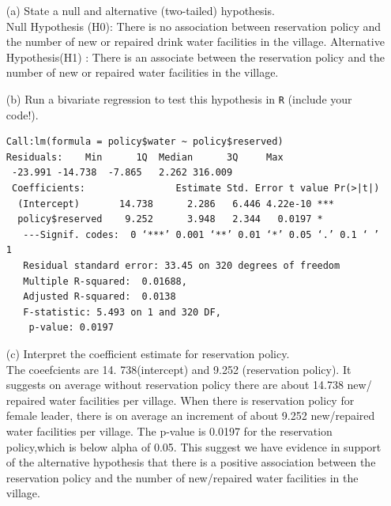 \documentclass[12pt,letterpaper]{article}
\begin{document}
\newpage
\begin{enumerate}
	\item [(a)] State a null and alternative (two-tailed) hypothesis. 
\\Null Hypothesis (H0): There is no association between reservation policy and the number of new or repaired drink water facilities in the village.
Alternative Hypothesis(H1)	: There is an associate between the reservation policy and the number of new or repaired water facilities in the village.
	\vspace{6cm}
	\item [(b)] Run a bivariate regression to test this hypothesis in \texttt{R} (include your code!).
	  	
\begin{verbatim}
Call:lm(formula = policy$water ~ policy$reserved)
Residuals:    Min      1Q  Median      3Q     Max
 -23.991 -14.738  -7.865   2.262 316.009 
 Coefficients:                Estimate Std. Error t value Pr(>|t|)   
  (Intercept)       14.738      2.286   6.446 4.22e-10 ***
  policy$reserved    9.252      3.948   2.344   0.0197 * 
   ---Signif. codes:  0 ‘***’ 0.001 ‘**’ 0.01 ‘*’ 0.05 ‘.’ 0.1 ‘ ’ 1
   Residual standard error: 33.45 on 320 degrees of freedom
   Multiple R-squared:  0.01688,	
   Adjusted R-squared:  0.0138 
   F-statistic: 5.493 on 1 and 320 DF, 
    p-value: 0.0197
\end{verbatim} 	
	\vspace{6cm}
	\item [(c)] Interpret the coefficient estimate for reservation policy. 
\\ The coeefcients are 14. 738(intercept) and 9.252 (reservation policy). It suggests on average without reservation policy there are about 14.738 new/ repaired water facilities per village. When there is reservation policy for female leader, there is on average an increment of about 9.252 new/repaired water facilities per village.  The p-value is 0.0197 for the reservation policy,which is below alpha of 0.05. This suggest we have evidence in support of the alternative hypothesis that there is a positive association between the reservation policy and the number of new/repaired water facilities in the village.
\end{enumerate}
\end{document}
